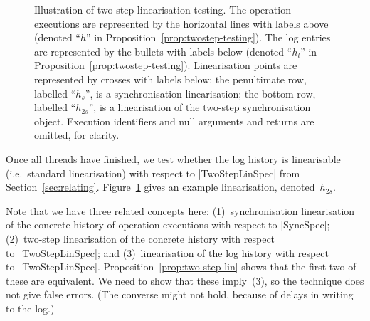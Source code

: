 \begin{figure}
\begin{center}
\def\y{-1.4} %
\def\ySLin{-2.5} %
\def\yLin{-3.6} %
\end{center}
\caption{Illustration of two-step linearisation testing.  The operation
  executions are represented by the horizontal lines with labels above
  (denoted ``$h$'' in Proposition~\ref{prop:twostep-testing}).  The log
  entries are represented by the bullets with labels below (denoted ``$h_l$''
  in Proposition~\ref{prop:twostep-testing}).  Linearisation points are
  represented by crosses with labels below: the penultimate row, labelled
  ``$h_s$'', is a synchronisation linearisation; the bottom row, labelled
  ``$h_{2s}$'', is a linearisation of the two-step synchronisation object.
  Execution identifiers and null arguments and returns are omitted, for
  clarity.}
\label{fig:twostep-timeline}
\end{figure}


Once all threads have finished, we test whether the log history is
linearisable (i.e.~standard linearisation) with respect to |TwoStepLinSpec|
from Section~\ref{sec:relating}.  Figure~\ref{fig:twostep-timeline} gives an
example linearisation, denoted~$h_{2s}$.

Note that we have three related concepts here: (1)~synchronisation
linearisation of the concrete history of operation executions with respect to
|SyncSpec|; (2)~two-step linearisation of the concrete history with respect
to~|TwoStepLinSpec|; and (3)~linearisation of the log history with respect
to~|TwoStepLinSpec|.  Proposition~\ref{prop:two-step-lin} shows that the first
two of these are equivalent.  We need to show that these imply~(3), so the
technique does not give false errors.  (The converse might not hold, because
of delays in writing to the log.)

